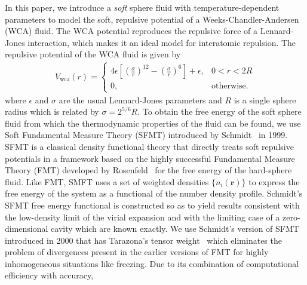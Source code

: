 \documentclass[letterpaper,twocolumn,amsmath,amssymb,prb]{revtex4-1}
\begin{document}
In this paper, we introduce a \textit{soft} sphere fluid 
with temperature-dependent parameters to model the soft, repulsive 
potential of a Weeks-Chandler-Andersen (WCA) fluid. 
The WCA potential reproduces the repulsive force of a Lennard-Jones 
interaction, which makes it an ideal model for interatomic repulsion. 
The repulsive potential of the WCA fluid is given by 
\newcommand\erf{\mathrm{erf}}
\newcommand\Vwca{V_{\mathrm{wca}}}
\newcommand\Verf{V_{\erf}}
\begin{align}
  \Vwca(r) =
  \begin{cases}
    4\epsilon \left[ \left(\frac{\sigma}{r}\right)^{12} -
    \left(\frac{\sigma}{r}\right)^{6} \right] + \epsilon, & 0 < r < 2R \\
    0, & \textrm{otherwise}.
  \end{cases}
\label{eq:Vwca}
\end{align}
where $\epsilon$ and $\sigma$ are the usual Lennard-Jones parameters
and $R$ is a single sphere radius which is related by $\sigma =
2^{5/6} R$.
%
To obtain the free energy of the soft sphere fluid from which the
thermodynamic properties of the fluid can be found, 
we use Soft Fundamental Measure Theory
(SFMT) introduced by Schmidt~\cite{schmidt1999density} in 1999.
SFMT is a classical density functional
theory that directly treats soft repulsive potentials in a framework
based on the highly successful Fundamental Measure Theory (FMT) developed
by Rosenfeld~\cite{rosenfeld1989} for the free energy of the hard-sphere fluid.
Like FMT, SMFT uses a set of weighted densities $\lbrace{n_i(\textbf{r})\rbrace}$ 
to express the free energy of the system
as a functional of the number density profile.
Schmidt's SFMT free energy functional is constructed so as to yield results 
consistent with the low-density limit of the virial expansion
and with the limiting case of a zero-dimensional cavity which are known 
exactly. 
We use Schmidt's version of SFMT introduced in 2000 that
has Tarazona's tensor weight~\cite{schmidt2000fluid,tarazona2000}
which eliminates the problem of divergences 
present in the earlier versions of FMT 
for highly inhomogeneous situations like freezing.
Due to its combination of computational efficiency with accuracy, 
\end{document}
